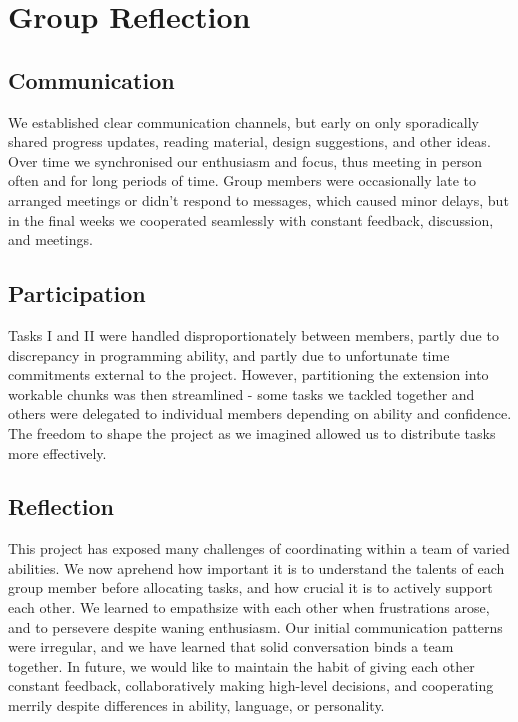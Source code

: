 \documentclass[11pt]{article}
\begin{document}
\section{Group Reflection}

\subsection{Communication}

We established clear communication channels, but early on only sporadically
shared progress updates, reading material, design suggestions, and other ideas.
Over time we synchronised our enthusiasm and focus, thus meeting in person
often and for long periods of time. Group members were occasionally late to
arranged meetings or didn't respond to messages, which caused minor delays, but
in the final weeks we cooperated seamlessly with constant feedback, discussion,
and meetings.

\subsection{Participation}

Tasks I and II were handled disproportionately between members, partly due to
discrepancy in programming ability, and partly due to unfortunate time
commitments external to the project. However, partitioning the extension into
workable chunks was then streamlined - some tasks we tackled together and
others were delegated to individual members depending on ability and
confidence. The freedom to shape the project as we imagined allowed us to
distribute tasks more effectively.

\subsection{Reflection}

This project has exposed many challenges of coordinating within a team of
varied abilities. We now aprehend how important it is to understand the talents
of each group member before allocating tasks, and how crucial it is to actively
support each other. We learned to empathsize with each other when frustrations
arose, and to persevere despite waning enthusiasm. Our initial communication
patterns were irregular, and we have learned that solid conversation binds
a team together. In future, we would like to maintain the habit of giving each
other constant feedback, collaboratively making high-level decisions, and
cooperating merrily despite differences in ability, language, or personality.
\end{document}
